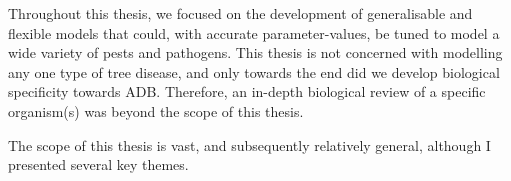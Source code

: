 Throughout this thesis, we focused on the development of generalisable and flexible models that could, with accurate parameter-values, be tuned to model a wide variety of pests and pathogens. This thesis is not concerned with modelling any one type of tree disease, and only towards the end did we develop biological specificity towards ADB. Therefore, an in-depth biological review of a specific organism(s) was beyond the scope of this thesis.


The scope of this thesis is vast, and subsequently relatively general, although I presented several key themes.